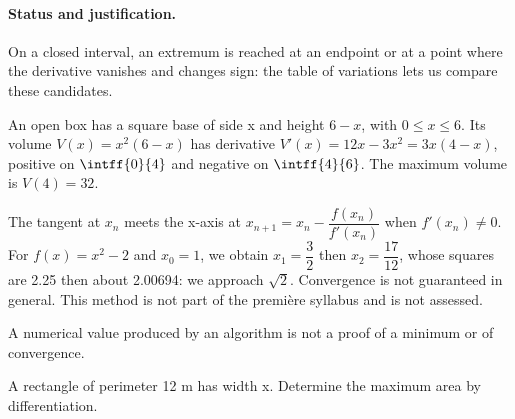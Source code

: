 \paragraph{Status and justification.} On a closed interval, an extremum is reached at an endpoint or at a point where the derivative vanishes and changes sign: the table of variations lets us compare these candidates.
\begin{example}An open box has a square base of side x and height $6-x$, with $0\le x\le6$. Its volume $V(x)=x^2(6-x)$ has derivative $V\prime(x)=12x-3x^2=3x(4-x)$, positive on $\intff{0}{4}$ and negative on $\intff{4}{6}$. The maximum volume is $V(4)=32$.\end{example}\label{C06-EX5}
\begin{beyond}The tangent at $x_n$ meets the x-axis at $x_{n+1}=x_n-\dfrac{f(x_n)}{f\prime(x_n)}$ when $f\prime(x_n)\ne0$. For $f(x)=x^2-2$ and $x_0=1$, we obtain $x_1=\dfrac{3}{2}$ then $x_2=\dfrac{17}{12}$, whose squares are \num{2,25} then about \num{2,00694}: we approach $\sqrt2$. Convergence is not guaranteed in general. This method is not part of the première syllabus and is not assessed.\end{beyond}
\begin{pitfall}A numerical value produced by an algorithm is not a proof of a minimum or of convergence.\end{pitfall}
\begin{application}A rectangle of perimeter 12 m has width x. Determine the maximum area by differentiation.\end{application}\label{C06-AP5}
\mxnewpage
